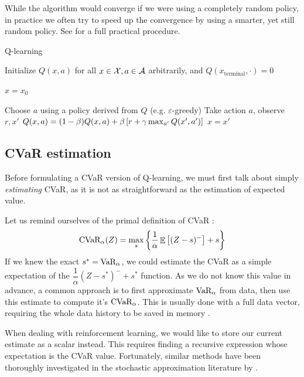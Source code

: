 While the algorithm would converge if we were using a completely random policy, in practice we often try to speed up the convergence by using a smarter, yet still random policy. See  for a full practical procedure.


\begin{algorithm}
\caption{Q-learning}
\begin{algorithmic}\label{alg:qlearning}
    \STATE Initialize $Q(x, a)$ for all $x \in \mathcal{X}, a \in \mathcal{A}$ arbitrarily, and $Q(x_\text{terminal}, \cdot) = 0$
    
		
	\STATE $x = x_0$
	
	\STATE Choose $a$ using a policy derived from $Q$ (e.g. $\varepsilon$-greedy)
	\STATE Take action $a$, observe $r, x'$
	\STATE $Q(x, a) = (1-\beta)Q(x, a) + \beta\left[ {r + \gamma \max_{a'} Q(x', a')} \right]$
	\STATE $x = x'$	
	\ENDWHILE
	
	\ENDFOR
\end{algorithmic}
\end{algorithm}


\subsection{CVaR estimation}\label{sec:cvarestimation}

Before formulating a CVaR version of Q-learning, we must first talk about simply \emph{estimating} CVaR, as it is not as straightforward as the estimation of expected value.

Let us remind ourselves of the primal definition of CVaR :
\begin{equation*}
\text{CVaR}_\alpha(Z)=
\max_s\left\lbrace \dfrac{1}{\alpha}\mathop{\mathbb{E}}
\left[ (Z-s)^-\right] + s  \right\rbrace 
\end{equation*}
If we knew the exact $s^*=\text{VaR}_\alpha$, we could estimate the CVaR as a simple expectation of the $\dfrac{1}{\alpha}(Z-s^*)^-+s^*$ function. As we do not know this value in advance, a common approach is to first approximate $\text{VaR}_\alpha$ from data, then use this estimate to compute it's $\text{CVaR}_\alpha$. This is usually done with a full data vector, requiring the whole data history to be saved in memory \cite{???}.

When dealing with reinforcement learning, we would like to store our current estimate as a scalar instead. This requires finding a recursive expression whose expectation is the CVaR value. Fortunately, similar methods have been thoroughly investigated in the stochastic approximation literature by \citet{robbins1951stochastic}.

